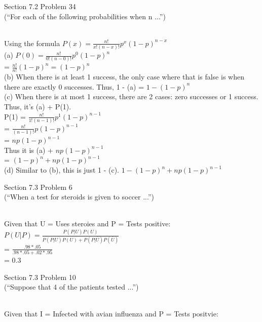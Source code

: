 \documentclass[11pt]{exam}
\begin{document}
\begin{questions}
\question[4] Section 7.2 Problem 34\\
(“For each of the following probabilities when n ...”) 
\begin{solution}\\
Using the formula $P(x) = \frac{n!}{x!(n-x)!} p^x(1-p)^{n-x}$ \\
(a) $P(0) = \frac{n!}{0!(n-0)!}p^0(1-p)^{n}$ \\
= $\frac{n!}{n!}(1-p)^n = (1-p)^n$ \\
(b) When there is at least 1 success, the only case where that is false is when there are exactly 0 successes. Thus, 1 - (a) = $1 - (1-p)^n$ \\
(c) When there is at most 1 success, there are 2 cases: zero successes or 1 success. Thus, it's (a) + P(1). \\
P(1) = $\frac{n!}{1!(n-1)!}p^1(1-p)^{n - 1}$ \\
= $\frac{n!}{(n-1)!}p(1-p)^{n - 1}$ \\
= $np(1 - p)^{n - 1}$ \\
Thus it is (a) + $np(1 - p)^{n - 1}$ \\
= $(1 - p)^n + np(1 - p)^{n - 1}$ \\
(d) Similar to (b), this is just 1 - (c). $1 - (1 - p)^n + np(1 - p)^{n - 1}$
\end{solution}
\question[2] Section 7.3 Problem 6\\
(“When a test for steroids is given to soccer ...”) 
\begin{solution}\\
Given that U = Uses steroies and P = Tests positive: \\
$P(U | P) = \frac{P(P|U) P(U)}{P(P|U)P(U) + P(P|\bar{U})P(\bar{U})}$ \\
= $\frac{.98 * .05}{.98 * .05 + .02 * .95}$ \\
= $0.3$
\end{solution}
\question[6] Section 7.3 Problem 10\\
(“Suppose that 4 of the patients tested ...”) 
\begin{solution}\\
Given that I = Infected with avian influenza and P = Tests positvie: \\

\end{solution}
\end{questions}
\end{document}
